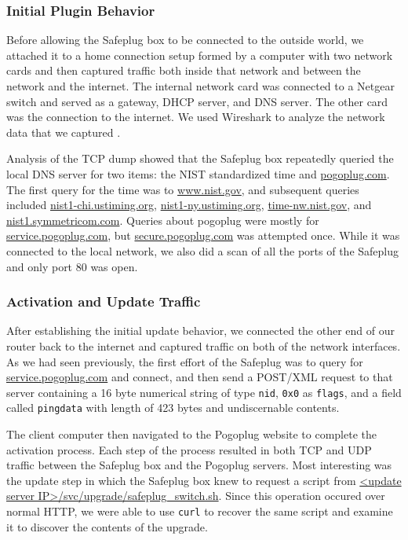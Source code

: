 \subsubsection{Initial Plugin Behavior}
Before allowing the Safeplug box to be connected to the outside world, we attached it to a home connection setup formed by a computer with two network cards and then captured traffic both inside that network and between the network and the internet.  The internal network card was connected to a Netgear switch and served as a gateway, DHCP server, and DNS server.  The other card was the connection to the internet.  We used Wireshark to analyze the network data that we captured \cite{wireshark}.  

Analysis of the TCP dump showed that the Safeplug box repeatedly queried the local DNS server for two items: the NIST standardized time and \url{pogoplug.com}.  The first query for the time was to \url{www.nist.gov}, and subsequent queries included \url{nist1-chi.ustiming.org}, \url{nist1-ny.ustiming.org}, \url{time-nw.nist.gov}, and \url{nist1.symmetricom.com}.  Queries about pogoplug were mostly for \url{service.pogoplug.com}, but \url{secure.pogoplug.com} was attempted once.  While it was connected to the local network, we also did a scan of all the ports of the Safeplug and only port 80 was open.

\subsubsection{Activation and Update Traffic}
\label{updatetraf}
After establishing the initial update behavior, we connected the other end of our router back to the internet and captured traffic on both of the network interfaces. As we had seen previously, the first effort of the Safeplug was to query for \url{service.pogoplug.com} and connect, and then send a POST/XML request to that server containing a 16 byte numerical string of type \verb!nid!, \verb!0x0! as \verb!flags!, and a field called \verb!pingdata! with length of 423 bytes and undiscernable contents.

The client computer then navigated to the Pogoplug website to complete the activation process.  Each step of the process resulted in both TCP and UDP traffic between the Safeplug box and the Pogoplug servers.  Most interesting was the update step in which the Safeplug box knew to request a script from \url{<update server IP>/svc/upgrade/safeplug\_switch.sh}.  Since this operation occured over normal HTTP, we were able to use \verb!curl! to recover the same script and examine it to discover the contents of the upgrade.

